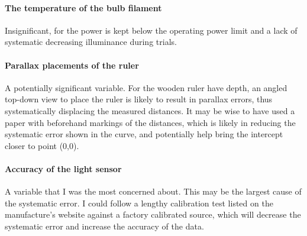 \documentclass[a4paper,12pt]{article}
\begin{document}
\paragraph{The temperature of the bulb filament}
Insignificant, for the power is kept below the operating power limit and a lack of systematic decreasing illuminance during trials.

\paragraph{Parallax placements of the ruler}
A potentially significant variable. For the wooden ruler have depth, an angled top-down view to place the ruler is likely to result in parallax errors, thus systematically displacing the measured distances. It may be wise to have used a paper with beforehand markings of the distances, which is likely in reducing the systematic error shown in the curve, and potentially help bring the intercept closer to point (0,0).

\paragraph{Accuracy of the light sensor}
A variable that I was the most concerned about. This may be the largest cause of the systematic error. I could follow a lengthy calibration test listed on the manufacture's website against a factory calibrated source, which will decrease the systematic error and increase the accuracy of the data.

\nocite{*}
\printbibliography
\end{document}

